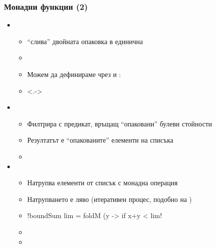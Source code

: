 \documentclass[alsotrans]{beamerswitch}
\begin{document}
\begin{frame}[fragile]
  \frametitle{Монадни функции (2)}
  \begin{overlayarea}{\textwidth}{\textheight}
  \begin{itemize}[<+->]
  \item {}
    \begin{itemize}
    \item ``слива'' двойната опаковка в единична
    \item {}
    \item Можем да дефинираме \lst{(>>=)} чрез  и :
    \item<.->  
    \end{itemize}
  \item {}
    \begin{itemize}
    \item Филтрира с предикат, връщащ ``опаковани'' булеви стойности
    \item Резултатът е ``опакованите'' елементи на списъка
    \item {}
    \end{itemize}
  \item {}
    \begin{itemize}
    \item Натрупва елементи от списък с монадна операция
    \item Натрупването е ляво (итеративен процес, подобно на )
    \item
\lst!boundSum lim = foldM (\x y -> if x+y < lim!\\
\hspace{30ex}
    \item {}
    \item {}
    \end{itemize}
  \end{itemize}
\end{overlayarea}
\end{frame}
\end{document}
